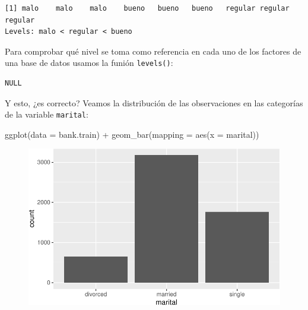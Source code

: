 \documentclass[
  letterpaper,
  DIV=11,
  numbers=noendperiod]{scrreprt}
\newenvironment{Shaded}{\begin{snugshade}}{\end{snugshade}}
\newcommand{\AttributeTok}[1]{\textcolor[rgb]{0.40,0.45,0.13}{#1}}
\newcommand{\FunctionTok}[1]{\textcolor[rgb]{0.28,0.35,0.67}{#1}}
\newcommand{\NormalTok}[1]{\textcolor[rgb]{0.00,0.23,0.31}{#1}}
\newcommand{\SpecialCharTok}[1]{\textcolor[rgb]{0.37,0.37,0.37}{#1}}
\begin{document}
\begin{verbatim}
[1] malo    malo    malo    bueno   bueno   bueno   regular regular regular
Levels: malo < regular < bueno
\end{verbatim}

Para comprobar qué nivel se toma como referencia en cada uno de los
factores de una base de datos usamos la funión \texttt{levels()}:

\begin{Shaded}
\end{Shaded}

\begin{verbatim}
NULL
\end{verbatim}

Y esto, ¿es correcto? Veamos la distribución de las observaciones en las
categorías de la variable \texttt{marital}:

\begin{Shaded}
\begin{Highlighting}[]
\FunctionTok{ggplot}\NormalTok{(}\AttributeTok{data =}\NormalTok{ bank.train) }\SpecialCharTok{+}
  \FunctionTok{geom\_bar}\NormalTok{(}\AttributeTok{mapping =} \FunctionTok{aes}\NormalTok{(}\AttributeTok{x =}\NormalTok{ marital))}
\end{Highlighting}
\end{Shaded}

\begin{figure}[H]

{\centering \includegraphics{eda_files/figure-pdf/unnamed-chunk-17-1.pdf}

}

\end{figure}
\end{document}
